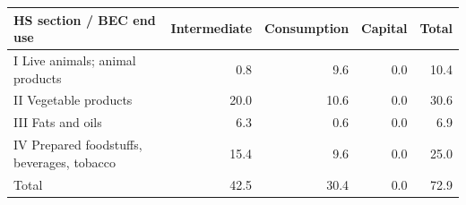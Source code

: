 \begin{tabular}{lrrrr}
\toprule
HS section / BEC end use & Intermediate & Consumption & Capital & Total \\
\midrule
I Live animals; animal products & 0.8 & 9.6 & 0.0 & 10.4 \\
II Vegetable products & 20.0 & 10.6 & 0.0 & 30.6 \\
III Fats and oils & 6.3 & 0.6 & 0.0 & 6.9 \\
IV Prepared foodstuffs, beverages, tobacco & 15.4 & 9.6 & 0.0 & 25.0 \\
\midrule
Total & 42.5 & 30.4 & 0.0 & 72.9 \\
\bottomrule
\end{tabular}
